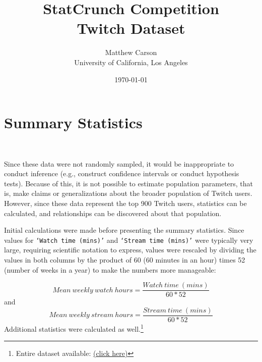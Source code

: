 \documentclass[12pt]{article}
\title{StatCrunch Competition\\ Twitch Dataset}
\author{Matthew Carson\\ University of California, Los Angeles}
\date{\today}
\begin{document}
\begin{titlepage}
\maketitle
\thispagestyle{empty} %
\end{titlepage}
\tableofcontents

\listoftables

\listoffigures
\newpage

\section{Summary Statistics}\

Since these data were not randomly sampled, it would be inappropriate to conduct inference (e.g., construct confidence intervals or conduct hypothesis tests). Because of this, it is not possible to estimate population parameters, that is, make claims or generalizations about the broader population of Twitch users. However, since these data represent the top 900 Twitch users, statistics can be calculated, and relationships can be discovered about that population.

Initial calculations were made before presenting the summary statistics. Since values for \texttt{`Watch time (mins)'} and \texttt{`Stream time (mins)'} were typically very large, requiring scientific notation to express, values were rescaled by dividing the values in both columns by the product of 60 (60 minutes in an hour) times 52 (number of weeks in a year) to make the numbers more manageable:

\begin{equation}
Mean\ weekly\ watch\ hours = \dfrac{Watch\ time\ (mins)}{60 \ast 52}
\end{equation}
and
\begin{equation}
Mean\ weekly\ stream\ hours = \dfrac{Stream\ time\ (mins)}{60 \ast 52}
\end{equation}
\newline
Additional statistics were calculated as well.\footnote{Entire dataset available: \href{https://www.statcrunch.com/app/index.html?dataid=4597814&token=OTI3Z8\%2F0N6hSC1KVw9hTXmyjHLnuZvqCMyuxkgn1QRYPhIQfDVLUFClF3Y41ShOi4C\%2BMKL5\%2FHgpBTXKukjWOPGD4pN\%2FCkiobeyKouIjPB7LoPvHOTDN7wUNtPZQd2\%2BNjOwAtSMQl9aKQrbthjCSuuSihsliiTo0MvakPDYN0lwiE8N11ITBSTS9QJH9QgHEmO4ahoV6IkASuVdKosV\%2FJSQ\%3D\%3D}{(click here)}}
\end{document}

